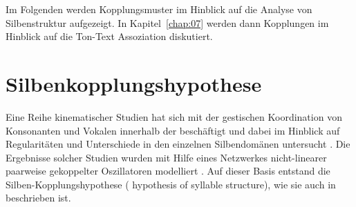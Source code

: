 Im Folgenden werden Kopplungsmuster im Hinblick auf die Analyse von Silbenstruktur aufgezeigt. In Kapitel~\ref{chap:07} werden dann Kopplungen im Hinblick auf die Ton-Text Assoziation diskutiert.

\section{Silbenkopplungshypothese}
\label{sec:0303}

Eine Reihe kinematischer Studien hat sich mit der gestischen Koordination von Konsonanten und Vokalen innerhalb der  beschäftigt und dabei  im Hinblick auf Regularitäten und Unterschiede in den einzelnen Silbendomänen untersucht \citep[vgl.][]{Browman1988, Honorof1995, Byrd1995, Bombien2010, Goldstein2007a, Goldstein2009, Hermes2008b, Marin2010, Nam2007a, Nam2009b, Shaw2009, Mücke2010b, Geng2010, Hermes2011b, Hermes2011a, Hermes2013}. Die Ergebnisse solcher Studien wurden mit Hilfe eines Netzwerkes nicht-linearer paarweise gekoppelter Oszillatoren modelliert \citep[vgl.][]{Browman2000, Saltzman2000, Nam2003, Nam2007a, Goldstein2007a, Goldstein2009}. Auf dieser Basis entstand die Silben-Kopplungshypothese ( hypothesis of syllable structure), wie sie auch in \citet{Hermes2016} beschrieben ist.

